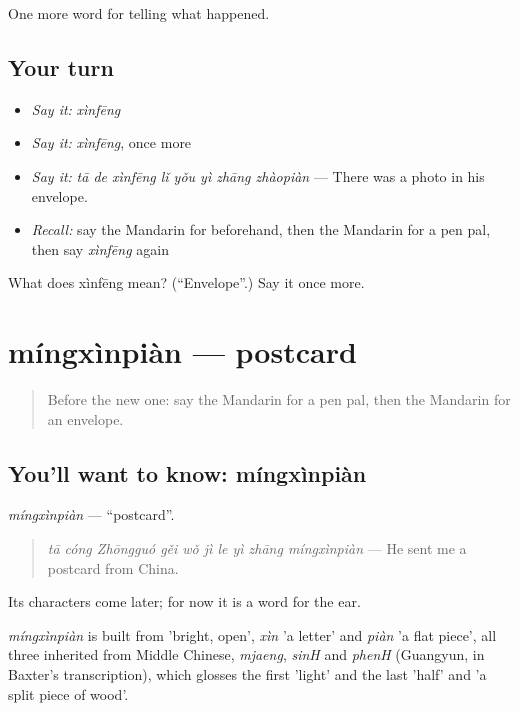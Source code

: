 \begin{grammarlens}[title={What you've built}]
One more word for telling what happened.
\end{grammarlens}

\subsection*{Your turn}
\begin{itemize}
\raggedright
  \item \emph{Say it:} \emph{xìnfēng}
  \item \emph{Say it:} \emph{xìnfēng}, once more
  \item \emph{Say it:} \emph{tā de xìnfēng lǐ yǒu yì zhāng zhàopiàn} — There was a photo in his envelope.
  \item \emph{Recall:} say the Mandarin for beforehand, then the Mandarin for a pen pal, then say \emph{xìnfēng} again
\end{itemize}

\begin{tcolorbox}[breakable,colback=teal!4,colframe=teal!35!black,title={Before you move on}]
What does xìnfēng mean? (\textquotedblleft{}Envelope\textquotedblright{}.) Say it once more.
\end{tcolorbox}
\section[míngxìnpiàn]{míngxìnpiàn — postcard}

\label{lesson:ZH-C318-mingxinpian}



\begin{quote}
Before the new one: say the Mandarin for a pen pal, then the Mandarin for an envelope.
\end{quote}

\subsection*{You'll want to know: míngxìnpiàn}
\emph{míngxìnpiàn} — \textquotedblleft{}postcard\textquotedblright{}.

\begin{quote}
\emph{tā cóng Zhōngguó gěi wǒ jì le yì zhāng míngxìnpiàn} — He sent me a postcard from China.
\end{quote}

Its characters come later; for now it is a word for the ear.

\begin{cousinweb}
\emph{míngxìnpiàn} is built from  'bright, open', \emph{xìn} 'a letter' and \emph{piàn} 'a flat piece', all three inherited from Middle Chinese, \emph{mjaeng}, \emph{sinH} and \emph{phenH} (Guangyun, in Baxter's transcription), which glosses the first 'light' and the last 'half' and 'a split piece of wood'.
\end{cousinweb}

